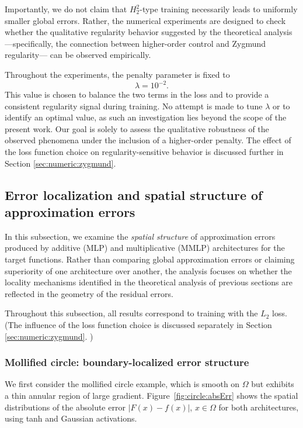 \documentclass[11pt,reqno]{amsart}
\numberwithin{equation}{section}
\theoremstyle{remark}
\theoremstyle{definition}
\def \L {L_2}
\def \H {H^2_2}
\begin{document}
Importantly, we do not claim that $\H$-type training necessarily leads to uniformly smaller global errors. Rather, the numerical experiments are designed to check whether the qualitative regularity behavior suggested by the theoretical analysis —specifically, the connection between higher-order control and Zygmund regularity— can be observed empirically.


Throughout the experiments, the penalty parameter is fixed to $$\lambda = 10^{-2}.$$
This value is chosen to balance the two terms in the loss and to provide a consistent regularity signal during training. No attempt is made to tune $\lambda$ or to identify an optimal value, as such an investigation lies beyond the scope of the present work. Our goal is solely to assess the qualitative robustness of the observed phenomena under the inclusion of a higher-order penalty. 
The effect of the loss function choice on regularity-sensitive behavior is discussed further in Section \ref{sec:numeric:zygmund}. 


\subsection{Error localization and spatial structure of approximation errors}
\label{sec:numeric:error_localization}

In this subsection, we examine the {\emph{spatial structure}} of approximation errors produced by additive (MLP) and multiplicative (MMLP) architectures for the target functions. 
Rather than comparing global approximation errors or claiming superiority of one architecture over another, the analysis focuses on whether the locality mechanisms identified in the theoretical analysis of previous sections are reflected in the geometry of the residual errors.

Throughout this subsection, all results correspond to training with the $\L$ loss. (The influence of the loss function choice is discussed separately in Section \ref{sec:numeric:zygmund}. )


\subsubsection{Mollified circle: boundary-localized error structure}
We first consider the mollified circle example, which is smooth on $\Omega$ but exhibits a thin annular region of large gradient. 
Figure~\ref{fig:circle:absErr} shows the spatial distributions of the absolute error \(|F(x)-f(x)|\), $x \in \Omega$ for both architectures, using tanh and Gaussian activations.
\end{document}
